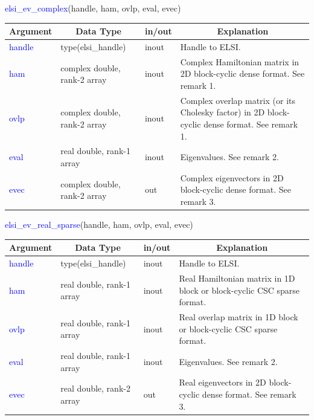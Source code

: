 \documentclass{report}
\begin{document}
\bigskip
\begin{labeling}{\hspace{6cm}}
\item [\hspace{0.3cm} \textcolor{blue}{elsi\_ev\_complex}(handle, ham, ovlp, eval, evec)]
\end{labeling}

\begin{tabular}[]{|p{20mm}|p{45mm}|p{15mm}|p{85mm}|}
\hline
\multicolumn{1}{|c|}{\textbf{Argument}} & \multicolumn{1}{c|}{\textbf{Data Type}} & \multicolumn{1}{c|}{\textbf{in/out}} & \multicolumn{1}{c|}{\textbf{Explanation}}\\
\hline
\textcolor{blue}{handle} & type(elsi\_handle)           & inout & Handle to ELSI.\\
\hline
\textcolor{blue}{ham}    & complex double, rank-2 array & inout & Complex Hamiltonian matrix in 2D block-cyclic dense format.  See remark 1.\\
\hline
\textcolor{blue}{ovlp}   & complex double, rank-2 array & inout & Complex overlap matrix (or its Cholesky factor) in 2D block-cyclic dense format.  See remark 1.\\
\hline
\textcolor{blue}{eval}   & real double, rank-1 array    & inout & Eigenvalues.  See remark 2.\\
\hline
\textcolor{blue}{evec}   & complex double, rank-2 array & out   & Complex eigenvectors in 2D block-cyclic dense format.  See remark 3.\\
\hline
\end{tabular}

\bigskip
\begin{labeling}{\hspace{6cm}}
\item [\hspace{0.3cm} \textcolor{blue}{elsi\_ev\_real\_sparse}(handle, ham, ovlp, eval, evec)]
\end{labeling}

\begin{table}[h]
\centering
\begin{tabular}[]{|p{20mm}|p{45mm}|p{15mm}|p{85mm}|}
\hline
\multicolumn{1}{|c|}{\textbf{Argument}} & \multicolumn{1}{c|}{\textbf{Data Type}} & \multicolumn{1}{c|}{\textbf{in/out}} & \multicolumn{1}{c|}{\textbf{Explanation}}\\
\hline
\textcolor{blue}{handle} & type(elsi\_handle)        & inout & Handle to ELSI.\\
\hline
\textcolor{blue}{ham}    & real double, rank-1 array & inout & Real Hamiltonian matrix in 1D block or block-cyclic CSC sparse format.\\
\hline
\textcolor{blue}{ovlp}   & real double, rank-1 array & inout & Real overlap matrix in 1D block or block-cyclic CSC sparse format.\\
\hline
\textcolor{blue}{eval}   & real double, rank-1 array & inout & Eigenvalues.  See remark 2.\\
\hline
\textcolor{blue}{evec}   & real double, rank-2 array & out   & Real eigenvectors in 2D block-cyclic dense format.  See remark 3.\\
\hline
\end{tabular}
\end{table}
\end{document}
